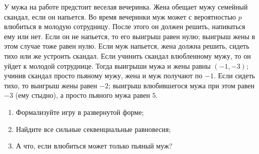 \begin{problem}\begin{source}
\cite{savva:nmu}
\end{source}
 У мужа на работе предстоит веселая вечеринка. Жена обещает мужу семейный скандал, если он напьется. Во время вечеринки муж может с вероятностью $p$ влюбиться в молодую сотрудницу. После этого он должен решить, напиваться ему или нет. Если он не напьется, то его выигрыш равен нулю; выигрыш жены в этом случае тоже равен нулю.
Если муж напьется, жена должна решить, сидеть тихо или же устроить скандал. Если учинить скандал влюбленному мужу, то он уйдет к молодой сотруднице. Тогда выигрыши мужа и жены равны $(-1,-3)$; учинив скандал просто пьяному мужу, жена и муж получают по $-1$. Если сидеть тихо, то выигрыш жены равен $-2$; выигрыш влюбившегося мужа при этом равен $-3$ (ему стыдно), а просто пьяного мужа равен $5$.
\begin{enumerate}
\item Формализуйте игру в развернутой форме;
\item Найдите все сильные секвенциальные равновесия;
\item А что, если влюбиться может только пьяный муж?
\end{enumerate}






\begin{sol}

\end{sol}
\end{problem}





